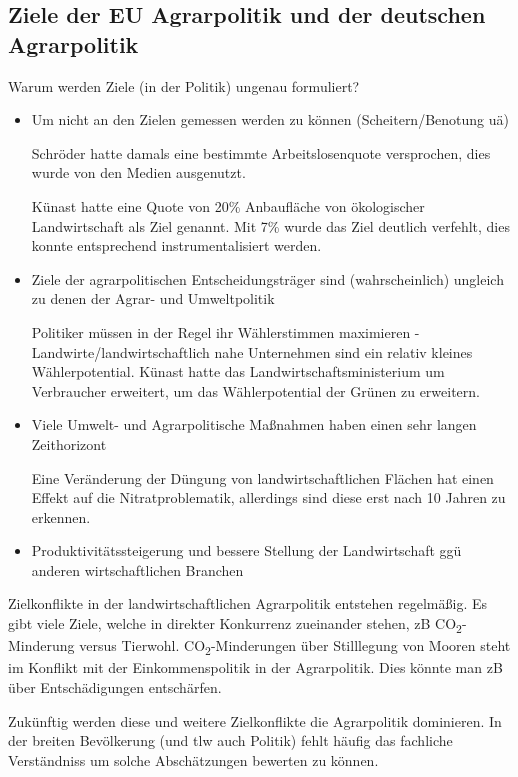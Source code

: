 \documentclass[11pt]{scrbook}
\begin{document}
\subsection{Ziele der \ac{EU} Agrarpolitik und der deutschen Agrarpolitik}
Warum werden Ziele (in der Politik) ungenau formuliert?
\begin{itemize}
	\item Um nicht an den Zielen gemessen werden zu können (Scheitern/Benotung uä)

		Schröder hatte damals eine bestimmte Arbeitslosenquote versprochen, dies wurde von den Medien ausgenutzt.

		Künast hatte eine Quote von 20\% Anbaufläche von ökologischer Landwirtschaft als Ziel genannt.
		Mit 7\% wurde das Ziel deutlich verfehlt, dies konnte entsprechend instrumentalisiert werden.

	\item Ziele der agrarpolitischen Entscheidungsträger sind (wahrscheinlich) ungleich zu denen der Agrar- und Umweltpolitik

		Politiker müssen in der Regel ihr Wählerstimmen maximieren - Landwirte/landwirtschaftlich nahe Unternehmen sind ein relativ kleines Wählerpotential.
		Künast hatte das Landwirtschaftsministerium um Verbraucher erweitert, um das Wählerpotential der Grünen zu erweitern.

	\item Viele Umwelt- und Agrarpolitische Maßnahmen haben einen sehr langen Zeithorizont

		Eine Veränderung der Düngung von landwirtschaftlichen Flächen hat einen Effekt auf die Nitratproblematik, allerdings sind diese erst nach 10 Jahren zu erkennen.

	\item Produktivitätssteigerung und bessere Stellung der Landwirtschaft ggü anderen wirtschaftlichen Branchen
\end{itemize}

Zielkonflikte in der landwirtschaftlichen Agrarpolitik entstehen regelmäßig.
Es gibt viele Ziele, welche in direkter Konkurrenz zueinander stehen, zB CO\textsubscript{2}-Minderung versus Tierwohl.
CO\textsubscript{2}-Minderungen über Stilllegung von Mooren steht im Konflikt mit der Einkommenspolitik in der Agrarpolitik. Dies könnte man zB über Entschädigungen entschärfen.

Zukünftig werden diese und weitere Zielkonflikte die Agrarpolitik dominieren.
In der breiten Bevölkerung (und tlw auch Politik) fehlt häufig das fachliche Verständniss um solche Abschätzungen bewerten zu können.
\end{document}
